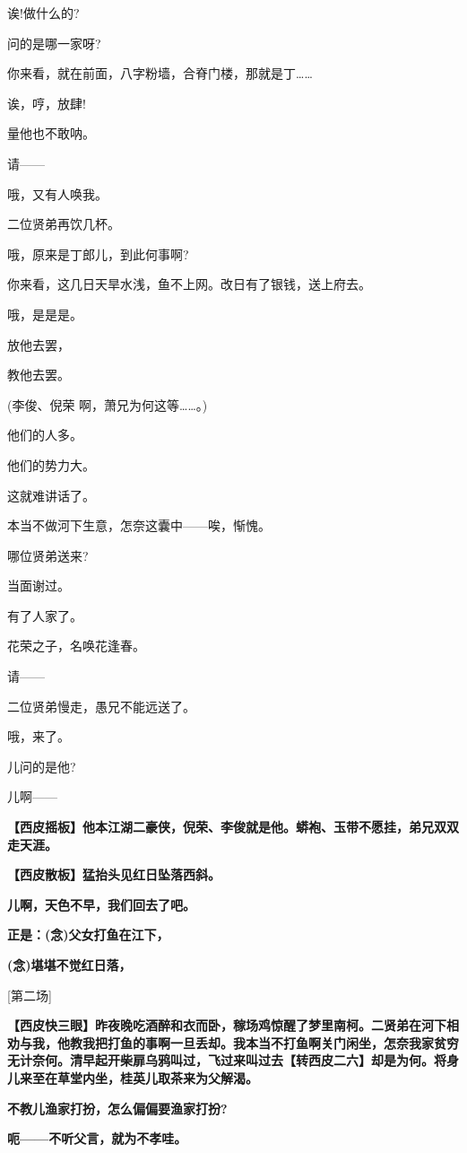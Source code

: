 诶!做什么的?

问的是哪一家呀?

你来看，就在前面，八字粉墙，合脊门楼，那就是丁\ldots{}\ldots{}

诶，哼，放肆!

量他也不敢呐。

请------

哦，又有人唤我。

二位贤弟再饮几杯。

哦，原来是丁郎儿，到此何事啊?

你来看，这几日天旱水浅，鱼不上网。改日有了银钱，送上府去。

哦，是是是。

放他去罢，

教他去罢。

(李俊、倪荣 啊，萧兄为何这等\ldots{}\ldots{}。)

他们的人多。

他们的势力大。

这就难讲话了。

本当不做河下生意，怎奈这囊中------唉，惭愧。

哪位贤弟送来?

当面谢过。

有了人家了。

花荣之子，名唤花逢春。

请------

二位贤弟慢走，愚兄不能远送了。

哦，来了。

儿问的是他?

儿啊------

\textbf{【西皮摇板】他本江湖二豪侠，倪荣、李俊就是他。蟒袍、玉带不愿挂，弟兄双双走天涯。}

\textbf{【西皮散板】猛抬头见红日坠落西斜。}

\textbf{儿啊，天色不早，我们回去了吧。}

\textbf{正是：(念)父女打鱼在江下，}

\textbf{(念)堪堪不觉红日落，}

{[}第二场{]}

\textbf{【西皮快三眼】昨夜晚吃酒醉和衣而卧，稼场鸡惊醒了梦里南柯。二贤弟在河下相劝与我，他教我把打鱼的事啊一旦丢却。我本当不打鱼啊关门闲坐，怎奈我家贫穷无计奈何。清早起开柴扉乌鸦叫过，飞过来叫过去【转西皮二六】却是为何。将身儿来至在草堂内坐，桂英儿取茶来为父解渴。}

\textbf{不教儿渔家打扮，怎么偏偏要渔家打扮?}

\textbf{呃------不听父言，就为不孝哇。}

